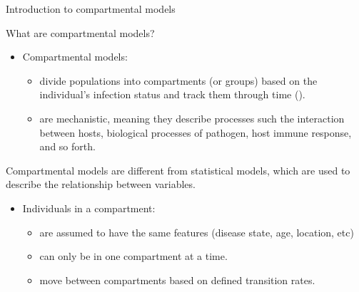 \documentclass[
  ignorenonframetext,
]{beamer}
\providecommand{\tightlist}{%
  \setlength{\itemsep}{0pt}\setlength{\parskip}{0pt}}\usepackage{longtable,booktabs,array}
\begin{document}
\begin{frame}{Introduction to compartmental models}
\label{introduction-to-compartmental-models}
\begin{block}{What are compartmental models?}
\label{what-are-compartmental-models}
\begin{itemize}
\tightlist
\item
  Compartmental models:

  \begin{itemize}
  \tightlist
  \item
    divide populations into compartments (or groups) based on the
    individual's infection status and track them through time
    ().
  \item
    are mechanistic, meaning they describe processes such the
    interaction between hosts, biological processes of pathogen, host
    immune response, and so forth.
  \end{itemize}
\end{itemize}
\end{block}
\end{frame}

\begin{frame}
Compartmental models are different from statistical models, which are
used to describe the relationship between variables.
\end{frame}

\begin{frame}
\begin{itemize}
\tightlist
\item
  Individuals in a compartment:

  \begin{itemize}
  \tightlist
  \item
    are assumed to have the same features (disease state, age, location,
    etc)
  \item
    can only be in one compartment at a time.
  \item
    move between compartments based on defined transition rates.
  \end{itemize}
\end{itemize}
\end{frame}
\end{document}

